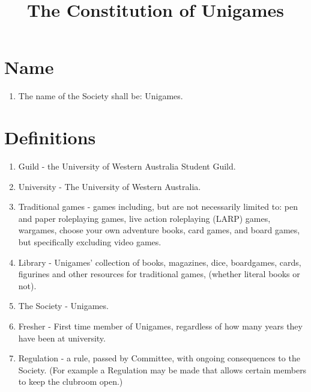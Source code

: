 \documentclass[a4paper]{article}
\title{The Constitution of Unigames}
\author{}
\date{}
\begin{document}
\maketitle


\section{Name} \label{sec:name}
\begin{enumerate}
    \item The name of the Society shall be: Unigames.
\end{enumerate}


\section{Definitions} \label{sec:definitions}
\begin{enumerate}
    \item Guild - the University of Western Australia Student Guild.
    \item University - The University of Western Australia.
    \item Traditional games - games including, but are not necessarily limited to: pen and paper roleplaying games, live action roleplaying (LARP) games, wargames, choose your own adventure books, card games, and board games, but specifically excluding video games.
    \item Library - Unigames' collection of books, magazines, dice, boardgames, cards, figurines and other resources for traditional games, (whether literal books or not).
    \item The Society - Unigames.
    \item Fresher - First time member of Unigames, regardless of how many years they have been at university.
    \item Regulation - a rule, passed by Committee, with ongoing consequences to the Society. (For example a Regulation may be made that allows certain members to keep the clubroom open.)
\end{enumerate}
\end{document}
